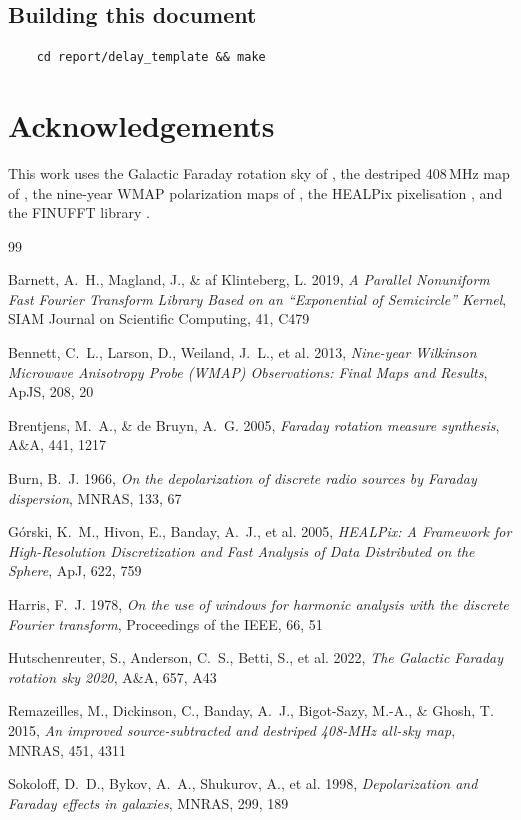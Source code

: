 \documentclass[11pt]{article}
\begin{document}
\subsection{Building this document}

\begin{verbatim}
    cd report/delay_template && make
\end{verbatim}

\section*{Acknowledgements}

This work uses the Galactic Faraday rotation sky of
\citet{hutschenreuter2022}, the destriped 408\,MHz map of
\citet{remazeilles2015}, the nine-year WMAP polarization maps of
\citet{bennett2013}, the HEALPix pixelisation \citep{gorski2005}, and
the FINUFFT library \citep{barnett2019}.

\begin{thebibliography}{99}

Barnett, A.~H., Magland, J., \& af Klinteberg, L. 2019,
\emph{A Parallel Nonuniform Fast Fourier Transform Library Based on an
``Exponential of Semicircle'' Kernel},
SIAM Journal on Scientific Computing, 41, C479

Bennett, C.~L., Larson, D., Weiland, J.~L., et al. 2013,
\emph{Nine-year Wilkinson Microwave Anisotropy Probe (WMAP)
Observations: Final Maps and Results},
ApJS, 208, 20

Brentjens, M.~A., \& de Bruyn, A.~G. 2005,
\emph{Faraday rotation measure synthesis},
A\&A, 441, 1217

Burn, B.~J. 1966,
\emph{On the depolarization of discrete radio sources by Faraday
dispersion},
MNRAS, 133, 67

G\'orski, K.~M., Hivon, E., Banday, A.~J., et al. 2005,
\emph{HEALPix: A Framework for High-Resolution Discretization and Fast
Analysis of Data Distributed on the Sphere},
ApJ, 622, 759

Harris, F.~J. 1978,
\emph{On the use of windows for harmonic analysis with the discrete
Fourier transform},
Proceedings of the IEEE, 66, 51

Hutschenreuter, S., Anderson, C.~S., Betti, S., et al. 2022,
\emph{The Galactic Faraday rotation sky 2020},
A\&A, 657, A43

Remazeilles, M., Dickinson, C., Banday, A.~J., Bigot-Sazy, M.-A., \&
Ghosh, T. 2015,
\emph{An improved source-subtracted and destriped 408-MHz all-sky map},
MNRAS, 451, 4311

Sokoloff, D.~D., Bykov, A.~A., Shukurov, A., et al. 1998,
\emph{Depolarization and Faraday effects in galaxies},
MNRAS, 299, 189

\end{thebibliography}
\end{document}
